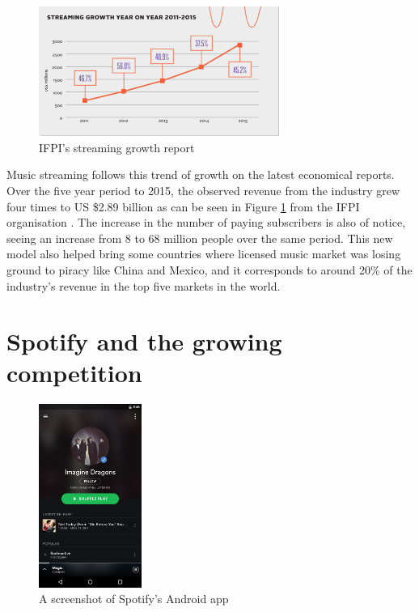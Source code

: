 \documentclass{kththesis}
\begin{document}
	\begin{figure}[h]
    \centering
    \includegraphics[width=0.7\textwidth, natwidth=580bp, natheight=313bp]{figures/ifpi_stream_growth.png}
    \caption{IFPI's streaming growth report}
    \label{fig:ifpi-growth-report}
\end{figure}

	Music streaming follows this trend of growth on the latest economical reports. Over the five year period to 2015, the observed revenue from the industry grew four times to US \$2.89 billion as can be seen in Figure \ref{fig:ifpi-growth-report} from the IFPI organisation \citep{ifpi}. The increase in the number of paying subscribers is also of notice, seeing an increase from 8 to 68 million people over the same period. This new model also helped bring some countries where licensed music market was losing ground to piracy like China and Mexico, and it corresponds to around 20\% of the industry's revenue in the top five markets in the world. 
	
	\section{Spotify and the growing competition}	
	
	\begin{figure}[h]
    \centering
    \includegraphics[width=0.3\textwidth, natwidth=506bp, natheight=900bp]{figures/spotify_screenshot.png}
    \caption{A screenshot of Spotify's Android app}
    \label{fig:spotify-screenshot}
\end{figure}
		
\end{document}
